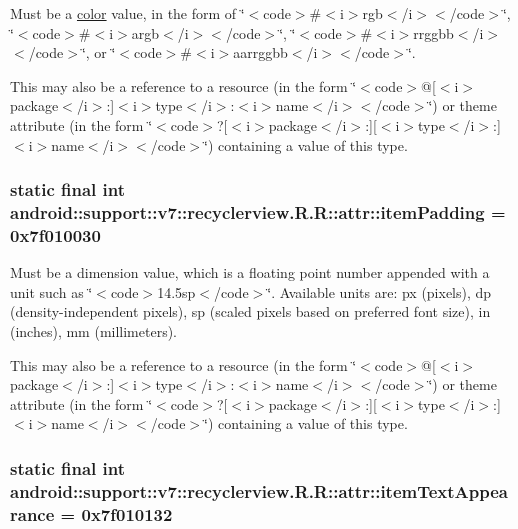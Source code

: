 Must be a \hyperlink{classandroid_1_1support_1_1v7_1_1recyclerview_1_1_r_1_1color}{color} value, in the form of \char`\"{}$<$code$>$\#$<$i$>$rgb$<$/i$>$$<$/code$>$\char`\"{}, \char`\"{}$<$code$>$\#$<$i$>$argb$<$/i$>$$<$/code$>$\char`\"{}, \char`\"{}$<$code$>$\#$<$i$>$rrggbb$<$/i$>$$<$/code$>$\char`\"{}, or \char`\"{}$<$code$>$\#$<$i$>$aarrggbb$<$/i$>$$<$/code$>$\char`\"{}. 

This may also be a reference to a resource (in the form \char`\"{}$<$code$>$@\mbox{[}$<$i$>$package$<$/i$>$:\mbox{]}$<$i$>$type$<$/i$>$:$<$i$>$name$<$/i$>$$<$/code$>$\char`\"{}) or theme attribute (in the form \char`\"{}$<$code$>$?\mbox{[}$<$i$>$package$<$/i$>$:\mbox{]}\mbox{[}$<$i$>$type$<$/i$>$:\mbox{]}$<$i$>$name$<$/i$>$$<$/code$>$\char`\"{}) containing a value of this type. \hypertarget{classandroid_1_1support_1_1v7_1_1recyclerview_1_1_r_1_1attr_d743ec77b8451a294b043c0b7be6effc}{
\subsubsection[{itemPadding}]{\setlength{\rightskip}{0pt plus 5cm}static final int android::support::v7::recyclerview.R.R::attr::itemPadding = 0x7f010030}}
\label{classandroid_1_1support_1_1v7_1_1recyclerview_1_1_r_1_1attr_d743ec77b8451a294b043c0b7be6effc}


Must be a dimension value, which is a floating point number appended with a unit such as \char`\"{}$<$code$>$14.5sp$<$/code$>$\char`\"{}. Available units are: px (pixels), dp (density-independent pixels), sp (scaled pixels based on preferred font size), in (inches), mm (millimeters). 

This may also be a reference to a resource (in the form \char`\"{}$<$code$>$@\mbox{[}$<$i$>$package$<$/i$>$:\mbox{]}$<$i$>$type$<$/i$>$:$<$i$>$name$<$/i$>$$<$/code$>$\char`\"{}) or theme attribute (in the form \char`\"{}$<$code$>$?\mbox{[}$<$i$>$package$<$/i$>$:\mbox{]}\mbox{[}$<$i$>$type$<$/i$>$:\mbox{]}$<$i$>$name$<$/i$>$$<$/code$>$\char`\"{}) containing a value of this type. \hypertarget{classandroid_1_1support_1_1v7_1_1recyclerview_1_1_r_1_1attr_7bf49d7d55ac44e46f470ce946412a1f}{
\subsubsection[{itemTextAppearance}]{\setlength{\rightskip}{0pt plus 5cm}static final int android::support::v7::recyclerview.R.R::attr::itemTextAppearance = 0x7f010132}}
\label{classandroid_1_1support_1_1v7_1_1recyclerview_1_1_r_1_1attr_7bf49d7d55ac44e46f470ce946412a1f}


